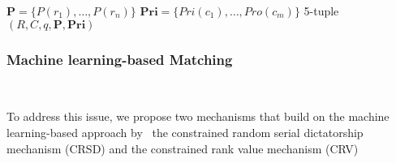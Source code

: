 \documentclass[letterpaper]{article} %
\begin{document}

    \(\mathbf { P }= \{P(r_1), \dots, P(r_n)\}\)
    \(\mathbf { Pri } = \{Pri(c_1), \dots, Pro(c_m)\}\)
    5-tuple \( ( R , C , q , \mathbf { P } , \mathbf { Pri } ) \)

    \subsubsection{Machine learning-based Matching}\label{machine-learning-based-matching}~\citet{olbergml}


    To address this issue, we propose two mechanisms that build on the machine learning-based approach by~\citet{bansak_2018} the constrained random serial dictatorship mechanism
    (CRSD) and the constrained rank value mechanism (CRV)~\citet{olbergml} %
\end{document}

